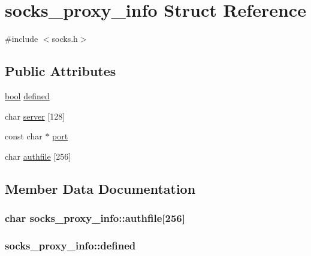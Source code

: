 \hypertarget{structsocks__proxy__info}{}\section{socks\+\_\+proxy\+\_\+info Struct Reference}
\label{structsocks__proxy__info}


{\ttfamily \#include $<$socks.\+h$>$}

\subsection*{Public Attributes}
\begin{DoxyCompactItemize}
\item 
\hyperlink{automatic_8c_abb452686968e48b67397da5f97445f5b}{bool} \hyperlink{structsocks__proxy__info_ab283d4cb7116b08b27e0151ca44e569e}{defined}
\item 
char \hyperlink{structsocks__proxy__info_a546f00e9abaf7613b763cfc6675aadc9}{server} \mbox{[}128\mbox{]}
\item 
const char $\ast$ \hyperlink{structsocks__proxy__info_a7b1b9cdaf83b172eb24b105c3639fd2e}{port}
\item 
char \hyperlink{structsocks__proxy__info_a03d1e58c566db67b3420e5d5b62e75af}{authfile} \mbox{[}256\mbox{]}
\end{DoxyCompactItemize}


\subsection{Member Data Documentation}
\hypertarget{structsocks__proxy__info_a03d1e58c566db67b3420e5d5b62e75af}{}
\subsubsection[{authfile}]{\setlength{\rightskip}{0pt plus 5cm}char socks\+\_\+proxy\+\_\+info\+::authfile\mbox{[}256\mbox{]}}\label{structsocks__proxy__info_a03d1e58c566db67b3420e5d5b62e75af}
\hypertarget{structsocks__proxy__info_ab283d4cb7116b08b27e0151ca44e569e}{}
\subsubsection[{defined}]{ socks\+\_\+proxy\+\_\+info\+::defined}\label{structsocks__proxy__info_ab283d4cb7116b08b27e0151ca44e569e}
\hypertarget{structsocks__proxy__info_a7b1b9cdaf83b172eb24b105c3639fd2e}{}
